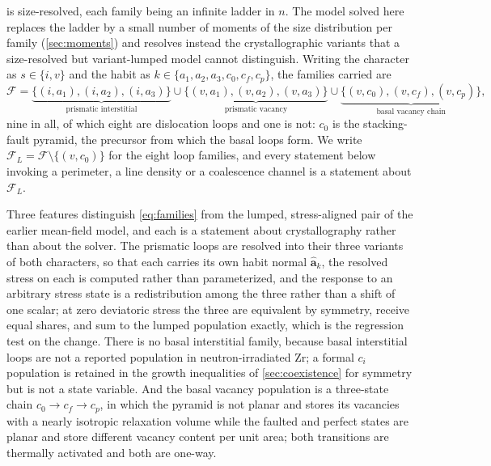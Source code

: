  is size-resolved, each family being an infinite ladder
in $n$. The model solved here replaces the ladder by a small number of moments of
the size distribution per family (\cref{sec:moments}) and resolves instead the
crystallographic variants that a size-resolved but variant-lumped model cannot
distinguish. Writing the character as $s\in\{i,v\}$ and the habit as
$k\in\{a_1,a_2,a_3,c_0,c_f,c_p\}$, the families carried are
\begin{equation}
  \mathcal F=
  \underbrace{\{(i,a_1),(i,a_2),(i,a_3)\}}_{\text{prismatic interstitial}}
  \cup
  \underbrace{\{(v,a_1),(v,a_2),(v,a_3)\}}_{\text{prismatic vacancy}}
  \cup
  \underbrace{\{(v,c_0),(v,c_f),(v,c_p)\}}_{\text{basal vacancy chain}},
  \label{eq:families}
\end{equation}
nine in all, of which eight are dislocation loops and one is not: $c_0$ is the
stacking-fault pyramid, the precursor from which the basal loops form. We write
$\mathcal F_L=\mathcal F\setminus\{(v,c_0)\}$ for the eight loop families, and
every statement below invoking a perimeter, a line density or a coalescence
channel is a statement about $\mathcal F_L$.

Three features distinguish \cref{eq:families} from the lumped, stress-aligned
pair of the earlier mean-field model, and each is a statement about
crystallography rather than about the solver. The prismatic loops are resolved
into their three variants of both characters, so that each carries its own habit
normal $\hat{\bm a}_k$, the resolved stress on each is computed rather than
parameterized, and the response to an arbitrary stress state is a redistribution
among the three rather than a shift of one scalar; at zero deviatoric stress the
three are equivalent by symmetry, receive equal shares, and sum to the lumped
population exactly, which is the regression test on the change. There is no basal
interstitial family, because basal interstitial \cloop{} loops are not a reported
population in neutron-irradiated Zr; a formal $c_i$ population is retained in the
growth inequalities of \cref{sec:coexistence} for symmetry but is not a state
variable. And the basal vacancy population is a three-state chain
$c_0\to c_f\to c_p$, in which the pyramid is not planar and stores its vacancies
with a nearly isotropic relaxation volume while the faulted and perfect states
are planar and store different vacancy content per unit area; both transitions
are thermally activated and both are one-way.



